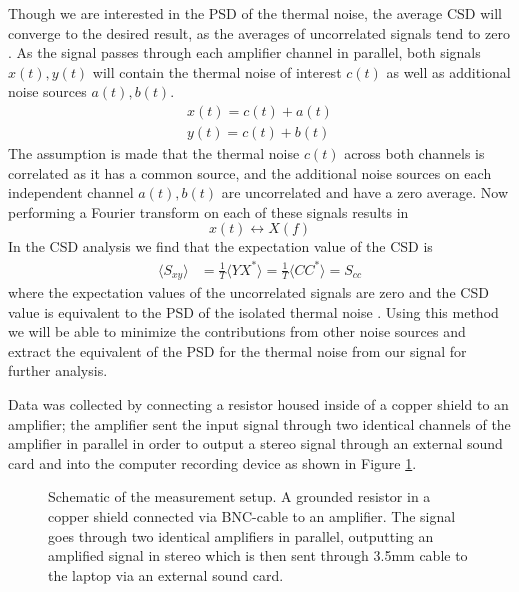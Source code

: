 \documentclass[aps,prl,twocolumn,superscriptaddress]{revtex4-1}
\begin{document}
Though we are interested in the PSD of the thermal noise, the average CSD will converge to the desired result, as the averages of uncorrelated signals tend to zero \cite{Rubiola2010}. As the signal passes through each amplifier channel in parallel, both signals $x(t), y(t)$ will contain the thermal noise of interest $c(t)$ as well as additional noise sources $a(t), b(t)$. 
\begin{align}
	x(t) = c(t) + a(t) \\
	y(t) = c(t) + b(t)
\end{align}
The assumption is made that the thermal noise $c(t)$ across both channels is correlated as it has a common source, and the additional noise sources on each independent channel $a(t), b(t)$ are uncorrelated and have a zero average. Now performing a Fourier transform on each of these signals results in 
\begin{equation}
	x(t) \leftrightarrow X(f)
\end{equation}
In the CSD analysis we find that the expectation value of the CSD is
\begin{align}
	\langle S_{xy}\rangle &= \frac{1}{T}\langle YX^*\rangle = \frac{1}{T}\langle CC^* \rangle = S_{cc}
\end{align}
where the expectation values of the uncorrelated signals are zero and the CSD value is equivalent to the PSD of the isolated thermal noise \cite{Rubiola2010}. Using this method we will be able to minimize the contributions from other noise sources and extract the equivalent of the PSD for the thermal noise from our signal for further analysis.


Data was collected by connecting a resistor housed inside of a copper shield to an amplifier; the amplifier sent the input signal through two identical channels of the amplifier in parallel in order to output a stereo signal through an external sound card and into the computer recording device as shown in Figure \ref{fig:circuit}. 

\begin{figure}[ht]
\centering
{}
\caption{Schematic of the measurement setup. A grounded resistor in a copper shield connected via BNC-cable to an amplifier. The signal goes through two identical amplifiers in parallel, outputting an amplified signal in stereo which is then sent through 3.5mm cable to the laptop via an external sound card.}
\label{fig:circuit}
\end{figure}
\end{document}
